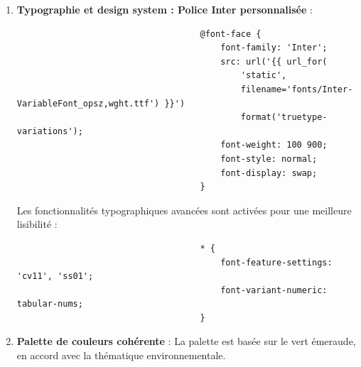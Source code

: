 \documentclass[a4paper,11pt]{article}
\begin{document}
\begin{enumerate}
                        \item \textbf{Typographie et design system : Police Inter personnalisée} :
                            \begin{tcolorbox}[colback=lightgray!6, colframe=black, left=-60mm, right=5mm, top=2mm, bottom=0mm, boxrule=0.1mm]
                                \begin{verbatim}
                                    @font-face {
                                        font-family: 'Inter';
                                        src: url('{{ url_for(
                                            'static', 
                                            filename='fonts/Inter-VariableFont_opsz,wght.ttf') }}') 
                                            format('truetype-variations');
                                        font-weight: 100 900;
                                        font-style: normal;
                                        font-display: swap;
                                    }
                                \end{verbatim}
                            \end{tcolorbox}

                            \noindent Les fonctionnalités typographiques avancées sont activées pour une meilleure lisibilité :
                            \begin{tcolorbox}[colback=lightgray!6, colframe=black, left=-45mm, right=5mm, top=2mm, bottom=0mm, boxrule=0.1mm]
                                \begin{verbatim}
                                    * {
                                        font-feature-settings: 'cv11', 'ss01';
                                        font-variant-numeric: tabular-nums;
                                    }
                                \end{verbatim}
                            \end{tcolorbox}

                        \item \textbf{Palette de couleurs cohérente} : La palette est basée sur le vert émeraude, en accord avec la thématique environnementale.


\end{enumerate}
\end{document}
